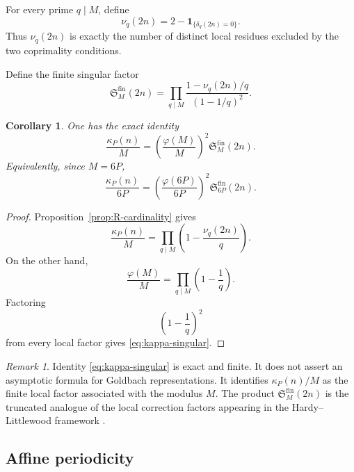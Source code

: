 \documentclass[12pt]{article}
\numberwithin{equation}{section}
\newtheorem{corollary}[theorem]{Corollary}
\theoremstyle{definition}
\theoremstyle{remark}
\newtheorem{remark}[theorem]{Remark}
\newcommand{\one}[1]{\mathbf 1_{\{#1\}}}
\begin{document}
For every prime $q\mid M$, define
\begin{equation}
\label{eq:nu-definition}
\nu_q(2n)
=
2-\one{\delta_q(2n)=0}.
\end{equation}
Thus $\nu_q(2n)$ is exactly the number of distinct local
residues excluded by the two coprimality conditions.

Define the finite singular factor
\begin{equation}
\label{eq:finite-singular-factor}
\mathfrak S_M^{\mathrm{fin}}(2n)
=
\prod_{q\mid M}
\frac{1-\nu_q(2n)/q}{(1-1/q)^2}.
\end{equation}

\begin{corollary}
\label{cor:singular-factor}
One has the exact identity
\begin{equation}
\label{eq:kappa-singular}
\frac{\kappa_P(n)}{M}
=
\left(\frac{\varphi(M)}{M}\right)^2
\mathfrak S_M^{\mathrm{fin}}(2n).
\end{equation}
Equivalently, since $M=6P$,
\[
\frac{\kappa_P(n)}{6P}
=
\left(\frac{\varphi(6P)}{6P}\right)^2
\mathfrak S_{6P}^{\mathrm{fin}}(2n).
\]
\end{corollary}

\begin{proof}
Proposition~\ref{prop:R-cardinality} gives
\[
\frac{\kappa_P(n)}{M}
=
\prod_{q\mid M}
\left(1-\frac{\nu_q(2n)}{q}\right).
\]
On the other hand,
\[
\frac{\varphi(M)}{M}
=
\prod_{q\mid M}\left(1-\frac1q\right).
\]
Factoring
\[
\left(1-\frac1q\right)^2
\]
from every local factor gives
\eqref{eq:kappa-singular}.
\end{proof}

\begin{remark}
Identity \eqref{eq:kappa-singular} is exact and finite. It does
not assert an asymptotic formula for Goldbach representations.
It identifies $\kappa_P(n)/M$ as the finite local factor
associated with the modulus $M$. The product
$\mathfrak S_M^{\mathrm{fin}}(2n)$ is the truncated analogue of
the local correction factors appearing in the
Hardy--Littlewood framework
\cite{HardyLittlewood1923,FriedlanderIwaniec2010}.
\end{remark}

\subsection{Affine periodicity}
\end{document}
